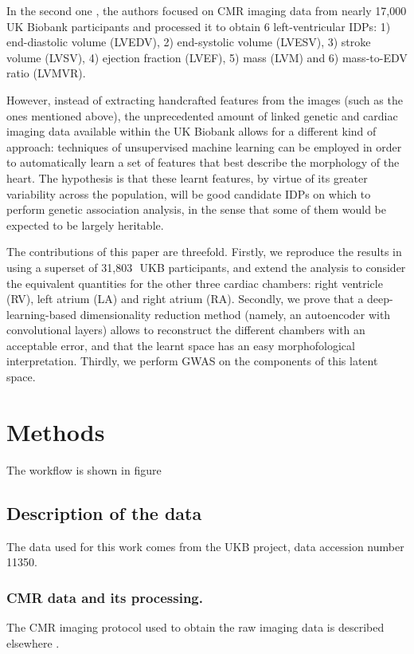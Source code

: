 \documentclass[twocolumn]{llncs}
\newcommand{\NCMR}{31,803\,} %
\newcommand{\ACCESSIONNUMBER}{11350}
\begin{document}
In the second one \cite{ref_nayaung}, the authors focused on CMR imaging data from nearly 17,000 UK Biobank participants and processed it to obtain 6 left-ventricular IDPs: 1) end-diastolic volume (LVEDV), 2) end-systolic volume (LVESV), 3) stroke volume (LVSV), 4) ejection fraction (LVEF), 5) mass (LVM) and 6) mass-to-EDV ratio (LVMVR).

However, instead of extracting handcrafted features from the images (such as the ones mentioned above), the unprecedented amount of linked genetic and cardiac imaging data available within the UK Biobank allows for a different kind of approach: techniques of unsupervised machine learning can be employed in order to automatically learn a set of features that best describe the morphology of the heart. 
The hypothesis is that these learnt features, by virtue of its greater variability across the population, will be good candidate IDPs on which to perform genetic association analysis, in the sense that some of them would be expected to be largely heritable.

The contributions of this paper are threefold. Firstly, we reproduce the results in \cite{ref_nayaung} using a superset of \NCMR\, UKB participants, and extend the analysis to consider the equivalent quantities for the other three cardiac chambers: right ventricle (RV), left atrium (LA) and right atrium (RA).
Secondly, we prove that a deep-learning-based dimensionality reduction method (namely, an autoencoder with convolutional layers) allows to reconstruct the different chambers with an acceptable error, and that the learnt space has an easy morphofological interpretation. Thirdly, we perform GWAS on the components of this latent space.

\section{Methods}
The workflow is shown in figure%


\subsection{Description of the data}
The data used for this work comes from the UKB project, data accession number \ACCESSIONNUMBER.

\subsubsection{CMR data and its processing.}
The CMR imaging protocol used to obtain the raw imaging data is described elsewhere \cite{ref_ukbb_cmr}. 
\end{document}
